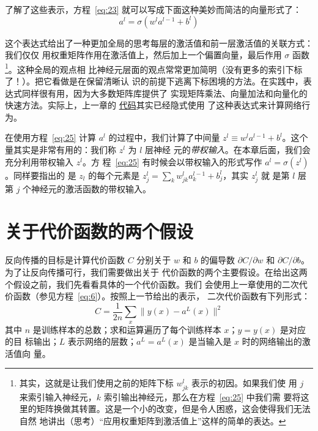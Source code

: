 了解了这些表示，方程~\eqref{eq:23} 就可以写成下面这种美妙而简洁的向量形式了：
\begin{equation}
  a^{l} = \sigma(w^l a^{l-1}+b^l)
  \label{eq:25}\tag{25}
\end{equation}

这个表达式给出了一种更加全局的思考每层的激活值和前一层激活值的关联方式：我们仅仅
用权重矩阵作用在激活值上，然后加上一个偏置向量，最后作用 $\sigma$ 函数
\footnote{其实，这就是让我们使用之前的矩阵下标 $w_{jk}^l$ 表示的初因。如果我们使
  用 $j$ 来索引输入神经元，$k$ 索引输出神经元，那么在方程~\eqref{eq:25} 中我们需
  要将这里的矩阵换做其转置。这是一个小的改变，但是令人困惑，这会使得我们无法自然
  地讲出（思考）“应用权重矩阵到激活值上”这样的简单的表达。}。这种全局的观点相
比神经元层面的观点常常更加简明（没有更多的索引下标了！）。把它看做是在保留清晰认
识的前提下逃离下标困境的方法。在实践中，表达式同样很有用，因为大多数矩阵库提供了
实现矩阵乘法、向量加法和向量化的快速方法。实际上，上一章的%
\hyperref[sec:implementing_our_network_to_classify_digits]{代码}其实已经隐式使用
了这种表达式来计算网络行为。

在使用方程~\eqref{eq:25} 计算 $a^l$ 的过程中，我们计算了中间量
$z^l \equiv w^l a^{l-1}+b^l$。这个量其实是非常有用的：我们称 $z^l$ 为 $l$ 层神经
元的\emph{带权输入}。在本章后面，我们会充分利用带权输入 $z^l$。方
程~\eqref{eq:25} 有时候会以带权输入的形式写作 $a^l = \sigma(z^l)$。同样要指出的
是 $z_l$ 的每个元素是 $z^l_j = \sum_k w^l_{jk} a^{l-1}_k+b^l_j$，其实 $z^l_j$ 就
是第 $l$ 层第 $j$ 个神经元的激活函数的带权输入。

\section{关于代价函数的两个假设}
\label{sec:TwoAssumptionsWeNeedAboutTheCostFunction}

反向传播的目标是计算代价函数 $C$ 分别关于 $w$ 和 $b$ 的偏导数 $\partial
C/\partial w$ 和 $\partial C / \partial b$。为了让反向传播可行，我们需要做出关于
代价函数的两个主要假设。在给出这两个假设之前，我们先看看具体的一个代价函数。我们
会使用上一章使用的二次代价函数（参见方程~\eqref{eq:6}）。按照上一节给出的表示，
二次代价函数有下列形式：
\begin{equation}
  C = \frac{1}{2n} \sum_x \|y(x)-a^L(x)\|^2
  \label{eq:26}\tag{26}
\end{equation}
其中 $n$ 是训练样本的总数；求和运算遍历了每个训练样本 $x$；$y = y(x)$ 是对应的目
标输出；$L$ 表示网络的层数；$a^L = a^L(x)$ 是当输入是 $x$ 时的网络输出的激活值向
量。

